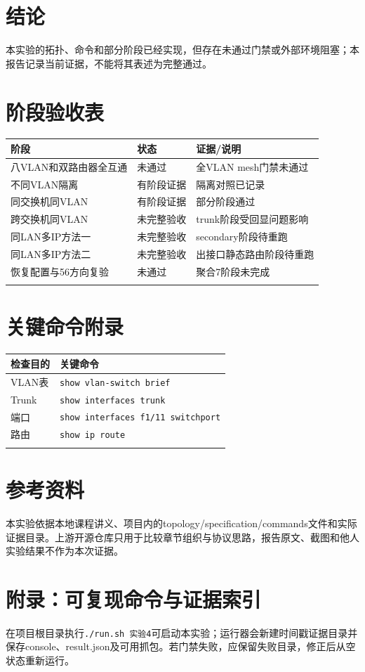 \documentclass[UTF8,a4paper,12pt]{ctexart}
\begin{document}
\section{结论}
本实验的拓扑、命令和部分阶段已经实现，但存在未通过门禁或外部环境阻塞；本报告记录当前证据，不能将其表述为完整通过。
\section{阶段验收表}
\begin{longtable}{p{}p{}p{}}\toprule 阶段 & 状态 & 证据/说明\\\midrule
八VLAN和双路由器全互通 & 未通过 & 全VLAN mesh门禁未通过\\
不同VLAN隔离 & 有阶段证据 & 隔离对照已记录\\
同交换机同VLAN & 有阶段证据 & 部分阶段通过\\
跨交换机同VLAN & 未完整验收 & trunk阶段受回显问题影响\\
同LAN多IP方法一 & 未完整验收 & secondary阶段待重跑\\
同LAN多IP方法二 & 未完整验收 & 出接口静态路由阶段待重跑\\
恢复配置与56方向复验 & 未通过 & 聚合7阶段未完成\\\\\bottomrule\end{longtable}
\section{关键命令附录}
\begin{longtable}{p{}p{}}\toprule 检查目的 & 关键命令\\\midrule
VLAN表 & \texttt{show vlan-switch brief}\\
Trunk & \texttt{show interfaces trunk}\\
端口 & \texttt{show interfaces f1/11 switchport}\\
路由 & \texttt{show ip route}\\\\\bottomrule\end{longtable}
\section{参考资料}
本实验依据本地课程讲义、项目内的topology/specification/commands文件和实际证据目录。上游开源仓库只用于比较章节组织与协议思路，报告原文、截图和他人实验结果不作为本次证据。
\section{附录：可复现命令与证据索引}
在项目根目录执行\texttt{./run.sh 实验4}可启动本实验；运行器会新建时间戳证据目录并保存console、result.json及可用抓包。若门禁失败，应保留失败目录，修正后从空状态重新运行。
\end{document}
